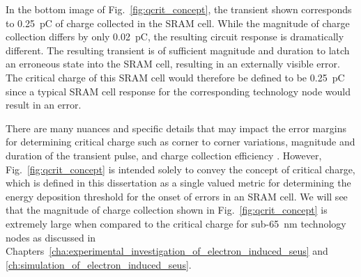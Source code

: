 In the bottom image of Fig.~\ref{fig:qcrit_concept}, the transient shown corresponds to 0.25~pC of charge collected in the SRAM cell. 
While the magnitude of charge collection differs by only 0.02~pC, the resulting circuit response is dramatically different. 
The resulting transient is of sufficient magnitude and duration to latch an erroneous state into the SRAM cell, resulting in an externally visible error.
The critical charge of this SRAM cell would therefore be defined to be 0.25~pC since a typical SRAM cell response for the corresponding technology node  would result in an error.

There are many nuances and specific details that may impact the error margins for determining critical charge such as corner to corner variations, magnitude and duration of the transient pulse, and charge collection efficiency \cite{Warren:2007vm,Warren:2007ca,kauppila2009bias,kauppila2011pvsram,kauppila2011pvcs}. 
However, Fig.~\ref{fig:qcrit_concept} is intended solely to convey the concept of critical charge, which is defined in this dissertation as a single valued metric for determining the energy deposition threshold for the onset of errors in an SRAM cell.
We will see that the magnitude of charge collection shown in Fig.~\ref{fig:qcrit_concept} is extremely large when compared to the critical charge for sub-65~nm technology nodes as discussed in Chapters~\ref{cha:experimental_investigation_of_electron_induced_seus} and \ref{ch:simulation_of_electron_induced_seus}.

